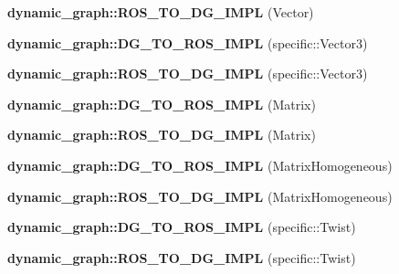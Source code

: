 \begin{DoxyCompactItemize}
{\bfseries dynamic\+\_\+graph\+::\+R\+O\+S\+\_\+\+T\+O\+\_\+\+D\+G\+\_\+\+I\+M\+PL} (Vector)
\item 
\mbox{\label{namespacedynamic__graph_a75ba177999020268d8c9b0547ff9b8b8}} 
{\bfseries dynamic\+\_\+graph\+::\+D\+G\+\_\+\+T\+O\+\_\+\+R\+O\+S\+\_\+\+I\+M\+PL} (specific\+::\+Vector3)
\item 
\mbox{\label{namespacedynamic__graph_aa9c6f9a640a7b012b0795531f14c4a95}} 
{\bfseries dynamic\+\_\+graph\+::\+R\+O\+S\+\_\+\+T\+O\+\_\+\+D\+G\+\_\+\+I\+M\+PL} (specific\+::\+Vector3)
\item 
\mbox{\label{namespacedynamic__graph_aa521c4cd3ca35d865a96061743a8b42a}} 
{\bfseries dynamic\+\_\+graph\+::\+D\+G\+\_\+\+T\+O\+\_\+\+R\+O\+S\+\_\+\+I\+M\+PL} (Matrix)
\item 
\mbox{\label{namespacedynamic__graph_aacf7e86396ce37e356b72a4dd06d4dcd}} 
{\bfseries dynamic\+\_\+graph\+::\+R\+O\+S\+\_\+\+T\+O\+\_\+\+D\+G\+\_\+\+I\+M\+PL} (Matrix)
\item 
\mbox{\label{namespacedynamic__graph_a79b178480de5cd5c8af027c859d6b7e1}} 
{\bfseries dynamic\+\_\+graph\+::\+D\+G\+\_\+\+T\+O\+\_\+\+R\+O\+S\+\_\+\+I\+M\+PL} (Matrix\+Homogeneous)
\item 
\mbox{\label{namespacedynamic__graph_a8935e81a8c4ea89b2d6349343d0f276c}} 
{\bfseries dynamic\+\_\+graph\+::\+R\+O\+S\+\_\+\+T\+O\+\_\+\+D\+G\+\_\+\+I\+M\+PL} (Matrix\+Homogeneous)
\item 
\mbox{\label{namespacedynamic__graph_a31a9095c3881b6bee15e84197900b8cd}} 
{\bfseries dynamic\+\_\+graph\+::\+D\+G\+\_\+\+T\+O\+\_\+\+R\+O\+S\+\_\+\+I\+M\+PL} (specific\+::\+Twist)
\item 
\mbox{\label{namespacedynamic__graph_ada45ff2abeb0b52a629bd8ece8a27886}} 
{\bfseries dynamic\+\_\+graph\+::\+R\+O\+S\+\_\+\+T\+O\+\_\+\+D\+G\+\_\+\+I\+M\+PL} (specific\+::\+Twist)
\item 
\mbox{\label{namespacedynamic__graph_a9f06698a083bc347b17f16107c5289e9}} 

\end{DoxyCompactItemize}
